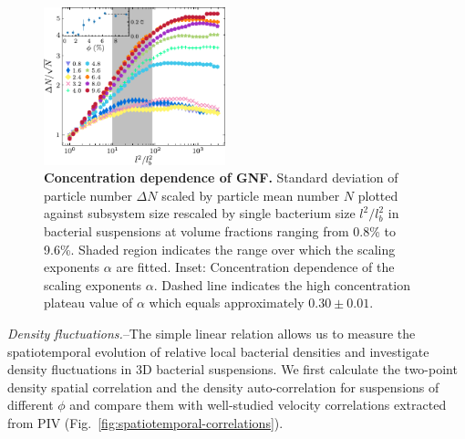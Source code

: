 \documentclass[twocolumn,aps,prl,amsmath,amssymb,longbibliography]{revtex4-2}
\begin{document}
\begin{figure}[ht]
\begin{center}
\includegraphics[width=0.47\textwidth]{figures/GNF/v3.pdf}
\caption[Concentration dependence of GNF.]
{
\textbf{Concentration dependence of GNF.}
Standard deviation of particle number $\Delta N$ scaled by particle mean number $N$ plotted against subsystem size rescaled by single bacterium size $l^2/l_b^2$ in bacterial suspensions at volume fractions ranging from 0.8\% to 9.6\%. Shaded region indicates the range over which the scaling exponents $\alpha$ are fitted.
Inset: Concentration dependence of the scaling exponents $\alpha$. Dashed line indicates the high concentration plateau value of $\alpha$ which equals approximately $0.30 \pm 0.01$.
}
\label{fig:GNF}
\end{center}
\end{figure}


\textit{Density fluctuations.}--The simple linear relation allows us to measure the spatiotemporal evolution of relative local bacterial densities and investigate density fluctuations in 3D bacterial suspensions. We first calculate the two-point density spatial correlation and the density auto-correlation for suspensions of different $\phi$ and compare them with well-studied velocity correlations extracted from PIV (Fig.~\ref{fig:spatiotemporal-correlations}).
\end{document}
